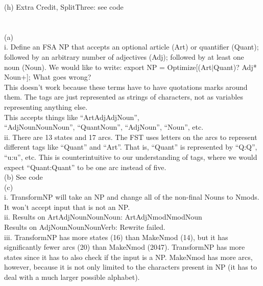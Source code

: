 \documentclass[11pt]{article} %
\begin{document}
(h) Extra Credit, SplitThree: see code\\

\newpage

\section{}

(a)\\

i. Define an FSA NP that accepts an optional article (Art) or quantifier (Quant); followed by an arbitrary number of adjectives (Adj); followed by at least one noun (Noun). We would like to write: export NP = Optimize[(Art$|$Quant)? Adj* Noun+]; What goes wrong?\\

This doesn’t work because these terms have to have quotations marks around them. The tags are just represented as strings of characters, not as variables representing anything else.\\

This accepts things like ``ArtAdjAdjNoun”, \\
``AdjNounNounNoun”, ``QuantNoun”, ``AdjNoun”, ``Noun”, etc.\\

ii. There are 13 states and 17 arcs. The FST uses letters on the arcs to represent different tags like ``Quant” and ``Art”. That is, ``Quant” is represented by ``Q:Q”, ``u:u”, etc. This is counterintuitive to our understanding of tags, where we would expect ``Quant:Quant” to be one arc instead of five.\\

(b) See code\\

(c)\\

i. TransformNP will take an NP and change all of the non-final Nouns to Nmods. It won’t accept input that is not an NP.\\

ii. Results on ArtAdjNounNounNoun: ArtAdjNmodNmodNoun\\
Results on AdjNounNounNounVerb: Rewrite failed.\\

iii. TransformNP has more states (16) than MakeNmod (14), but it has significantly fewer arcs (20) than MakeNmod (2047). TransformNP has more states since it has to also check if the input is a NP. MakeNmod has more arcs, however, because it is not only limited to the characters present in NP (it has to deal with a much larger possible alphabet).\\
\end{document}

